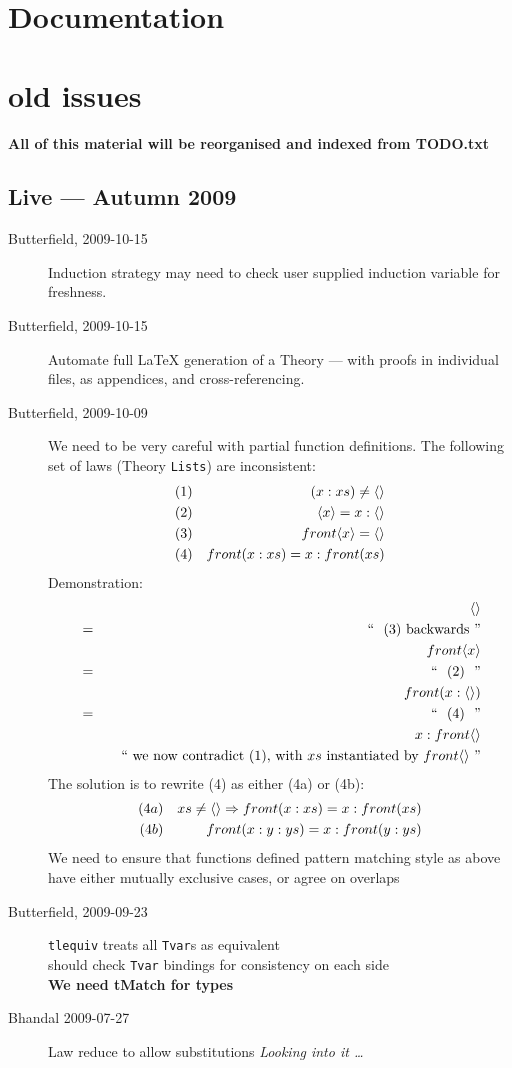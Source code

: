 \section{Documentation}

\section{old issues}

\textbf{All of this material will be reorganised and indexed
from TODO.txt}

\subsection{Live --- Autumn 2009}


\begin{description}
  \item[Butterfield, 2009-10-15]
    Induction strategy may need to check user supplied induction variable
    for freshness.
  \item[Butterfield, 2009-10-15]
    Automate full LaTeX generation of a Theory
    --- with proofs in individual files, as appendices,
    and cross-referencing.
  \item[Butterfield, 2009-10-09]
    We need to be very careful with partial function definitions.
    The following set of laws (Theory \texttt{Lists}) are inconsistent:
    \begin{eqnarray*}
       (1) && (x:xs) \neq \langle \rangle
    \\ (2) && \langle x\rangle = x : \langle \rangle
    \\ (3) && front \langle x\rangle = \langle \rangle
    \\ (4) && front (x:xs) = x : front (xs)
    \end{eqnarray*}
    Demonstration:
    \begin{eqnarray*}
      && \nil
    \EQ{ (3) backwards}
    \\&& front\seqof x
    \EQ{ (2) }
    \\&& front(x : \nil)
    \EQ{ (4) }
    \\&& x: front\nil
    \\&& \coz{we now contradict (1), with $xs$ instantiated by $front\nil$}
    \end{eqnarray*}
    The solution is to rewrite (4) as either (4a) or (4b):
    \begin{eqnarray*}
       (4a) && xs \neq \langle \rangle \Rightarrow front(x:xs) = x:front(xs)
    \\ (4b) && front(x:y:ys) = x:front(y:ys)
    \end{eqnarray*}
    We need to ensure that functions defined pattern matching style as
    above have either mutually exclusive cases, or agree on overlaps
  \item[Butterfield, 2009-09-23]
    \texttt{tlequiv} treats all \texttt{Tvar}s as equivalent
    \\ should check \texttt{Tvar} bindings for consistency on each side
    \\ \textbf{We need tMatch for types}
  \item[Bhandal 2009-07-27]
     Law reduce to allow substitutions
     \textit{
       Looking into it \ldots
     }
\end{description}
